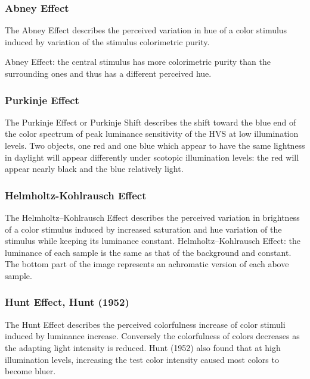 \subsubsection{Abney Effect}%
\label{subsubsec:abney-effect}

The Abney Effect describes the perceived variation in hue of a color stimulus induced by variation of the stimulus colorimetric purity.

Abney Effect: the central stimulus has more colorimetric purity than the surrounding ones and thus has a different perceived hue.

\subsubsection{Purkinje Effect}%
\label{subsubsec:purkinje-effect}

The Purkinje Effect or Purkinje Shift describes the shift toward the blue end of the color spectrum of peak luminance sensitivity of the HVS at low illumination levels.
Two objects, one red and one blue which appear to have the same lightness in daylight will appear differently under scotopic illumination levels: the red will appear nearly black and the blue relatively light.

\subsubsection{Helmholtz-Kohlrausch Effect}%
\label{subsubsec:helmholtz-kohlrausch-effect}

The Helmholtz–Kohlrausch Effect describes the perceived variation in brightness of a color stimulus induced by increased saturation and hue variation of the stimulus while keeping its luminance constant.
Helmholtz–Kohlrausch Effect: the luminance of each sample is the same as that of the background and constant. The bottom part of the image represents an achromatic version of each above sample.

\subsubsection{Hunt Effect, Hunt (1952)}%
\label{subsubsec:hunt-effect-hunt-1952}

The Hunt Effect describes the perceived colorfulness increase of color stimuli induced by luminance increase. Conversely the colorfulness of colors decreases as the adapting light intensity is reduced.
Hunt (1952) also found that at high illumination levels, increasing the test color intensity caused most colors to become bluer.

